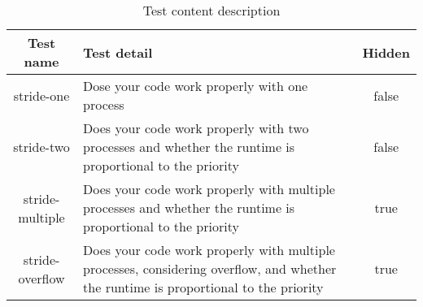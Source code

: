 \documentclass{article}
\begin{document}
\begin{table}[h]
    \caption{Test content description}
    \centering
    \begin{tabularx}{\textwidth}{cXc} 
    \toprule
    Test name            & Test detail   & Hidden  \\
    \midrule
    stride-one      & Dose your code work properly with one process & false  \\
    stride-two      & Does your code work properly with two processes and whether the runtime is proportional to the priority  & false     \\
    stride-multiple & Does your code work properly with multiple processes and whether the runtime is proportional to the priority & true     \\
    stride-overflow & Does your code work properly with multiple processes, considering overflow, and whether the runtime is proportional to the priority  & true \\
    \bottomrule
    \end{tabularx}
\end{table}
\end{document}

